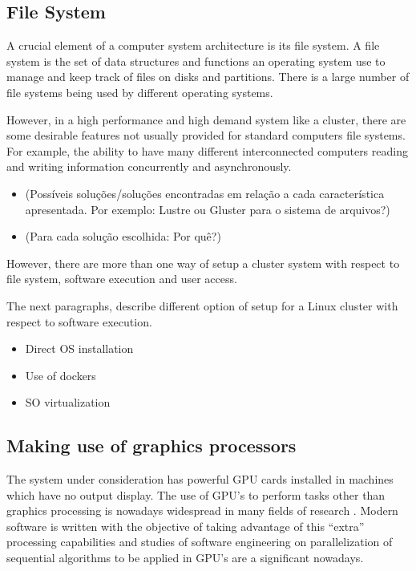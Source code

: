 \documentclass[twoside,a4paper,12pt,english]{inac17}
\begin{document}
\subsection{File System}

A crucial element of a computer system architecture is its file system. A file system is the set of data structures and functions an operating system
use to manage and keep track of files on disks and partitions. There is a large number of file systems being used by different operating systems\cite{linuxbook}.

However, in a high performance and high demand system like a cluster, there are some desirable features not usually provided for standard computers file systems.
For example, the ability to have many different interconnected computers reading and writing information concurrently and asynchronously. 

\begin{itemize}

\item (Possíveis soluções/soluções encontradas em relação a cada característica apresentada. Por exemplo: Lustre \cite{Lustre} ou Gluster\cite{gluster} para o sistema de arquivos?)

\item (Para cada solução escolhida: Por quê?)
  
\end{itemize}

However, there are more than one way of setup a cluster system with respect
to file system, software execution and user access.

The next paragraphs, describe different option of setup for a Linux cluster with respect to software execution.

\begin{itemize}
\item Direct OS installation
\item Use of dockers
\item SO virtualization
\end{itemize}

\subsection{Making use of graphics processors}

The system under consideration has powerful GPU cards installed in machines
which have no output display. The use of GPU's to perform tasks other than graphics processing
is nowadays widespread in many fields of research \cite{UsoDeGpus}. Modern software is written with
the objective of taking advantage of this ``extra'' processing capabilities and studies of software
engineering on parallelization of sequential algorithms to be applied in GPU's are a significant
nowadays.
\end{document}
